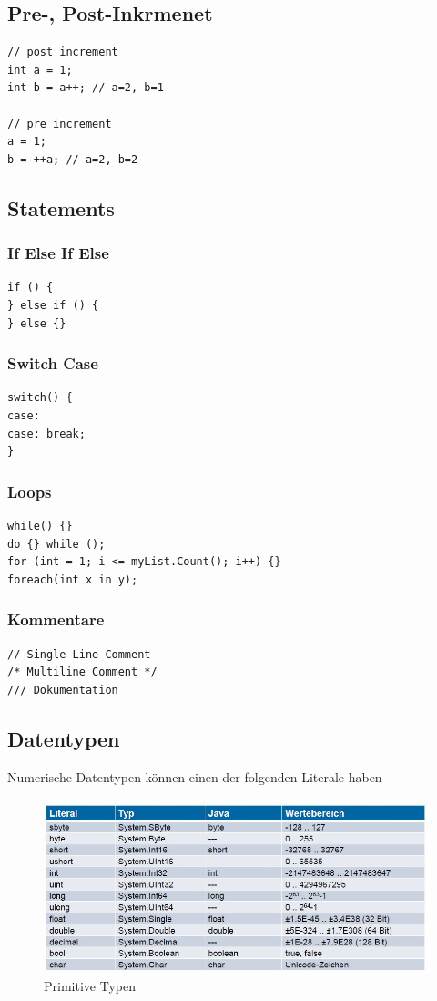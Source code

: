 \documentclass[
a4paper,
oneside,
10pt,
fleqn,
headsepline,
toc=listofnumbered, 
bibliography=totocnumbered]{scrartcl}
\begin{document}
\clearpage

\subsection{Pre-, Post-Inkrmenet}
\begin{lstlisting}
// post increment
int a = 1;
int b = a++; // a=2, b=1

// pre increment
a = 1;
b = ++a; // a=2, b=2
\end{lstlisting}

\subsection{Statements}
\subsubsection{If Else If Else}
\begin{lstlisting}
if () {
} else if () {
} else {}
\end{lstlisting}

\subsubsection{Switch Case}
\begin{lstlisting}
switch() {
case:
case: break;
}
\end{lstlisting}

\subsubsection{Loops}
\begin{lstlisting}
while() {}
do {} while ();
for (int = 1; i <= myList.Count(); i++) {}
foreach(int x in y);
\end{lstlisting}

\subsubsection{Kommentare}
\begin{lstlisting}
// Single Line Comment
/* Multiline Comment */
/// Dokumentation
\end{lstlisting}

\clearpage

\subsection{Datentypen}
Numerische Datentypen können einen der folgenden Literale haben
\begin{figure}[!ht]
	\centering
	\includegraphics[width=0.8\linewidth]{images/primitive_types}
	\caption{Primitive Typen}
	\label{fig:primitivetypes}
\end{figure}
\end{document}
